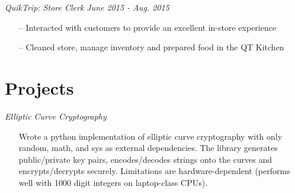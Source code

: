 \documentclass[line,overlapped,9pt]{res}
\begin{document}
\begin{resume}
            {\sl QuikTrip: Store Clerk \hfill June 2015 - Aug. 2015}
            \begin{itemize} 
            \item[--] Interacted with customers to provide an excellent in-store experience 
            \item[--] Cleaned store, manage inventory and prepared food in the QT Kitchen 
            \end{itemize}

     \section{Projects}
             
            {\sl Elliptic Curve Cryptography} 
            \begin{itemize} 
            \item[] Wrote a python implementation of elliptic curve cryptography with only random, math, and sys
              as external dependencies. The library generates public/private key pairs, encodes/decodes strings
              onto the curves and encrypts/decrypts securely. Limitations are hardware-dependent (performs well
              with 1000 digit integers on laptop-class CPUs). 
              \end{itemize}
       
\end{resume}
\end{document}
